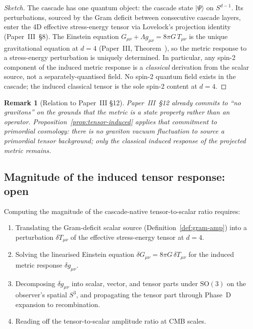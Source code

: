 \documentclass[12pt,a4paper]{article}
\newtheorem*{remark}{Remark}
\begin{document}
\begin{proof}[Sketch]
The cascade has one quantum object: the cascade state $|\Psi\rangle$ on
$S^{d-1}$. Its perturbations, sourced by the Gram deficit between consecutive
cascade layers, enter the 4D effective stress-energy tensor via Lovelock's
projection identity (Paper~III~\S8). The Einstein equation
$G_{\mu\nu} + \Lambda g_{\mu\nu} = 8\pi G\,T_{\mu\nu}$ is the unique
gravitational equation at $d = 4$ (Paper~III, Theorem~), so the metric
response to a stress-energy perturbation is uniquely determined. In
particular, any spin-2 component of the induced metric response is a
\emph{classical} derivation from the scalar source, not a separately-quantised
field. No spin-2 quantum field exists in the cascade; the induced classical
tensor is the sole spin-2 content at $d = 4$.
\end{proof}

\begin{remark}[Relation to Paper~III \S12]
Paper~III~\S12 already commits to ``no gravitons'' on the grounds that the
metric is a state property rather than an operator. Proposition~\ref{prop:tensor-induced}
applies that commitment to primordial cosmology: there is no graviton vacuum
fluctuation to source a primordial tensor background; only the classical
induced response of the projected metric remains.
\end{remark}

\subsection{Magnitude of the induced tensor response: open}

Computing the magnitude of the cascade-native tensor-to-scalar ratio requires:

\begin{enumerate}[nosep]
\item Translating the Gram-deficit scalar source (Definition~\ref{def:gram-amp})
into a perturbation $\delta T_{\mu\nu}$ of the effective stress-energy tensor
at $d = 4$.
\item Solving the linearised Einstein equation $\delta G_{\mu\nu} = 8\pi G\,\delta T_{\mu\nu}$ for the induced metric response $\delta g_{\mu\nu}$.
\item Decomposing $\delta g_{\mu\nu}$ into scalar, vector, and tensor parts
under $\mathrm{SO}(3)$ on the observer's spatial $S^3$, and propagating the
tensor part through Phase~D expansion to recombination.
\item Reading off the tensor-to-scalar amplitude ratio at CMB scales.
\end{enumerate}
\end{document}
